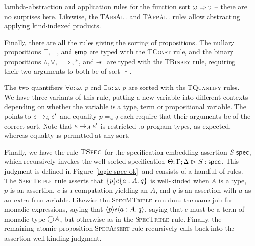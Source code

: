 % 
lambda-abstraction and application rules for the function sort $\omega
\Rightarrow \upsilon$ -- there are no surprises here. Likewise, the
\textsc{TAbsAll} and \textsc{TAppAll} rules allow abstracting
applying kind-indexed products.

Finally, there are all
the rules giving the sorting of propositions. The nullary propositions
$\top, \bot$, and $\mathsf{emp}$ are typed with the \textsc{TConst}
rule, and the binary propositions $\land, \vee, \implies, *$, and
$-\!\!*\,$ are typed with the \textsc{TBinary} rule, requiring
their two arguments to both be of sort $\assert$.


The two quantifiers $\forall u:\omega.\;p$ and $\exists u:\omega.\;p$
are sorted with the \textsc{TQuantify} rules. We have three
variants of this rule, putting a new variable into different contexts
depending on whether the variable is a type, term or propositional
variable.  The points-to $e \mapsto_A e'$ and equality $p =_\omega
q$ each require that their arguments be of the correct sort. Note that
$e \mapsto_A e'$ is restricted to program types, as expected,
whereas equality is permitted at any sort.

Finally, we have the rule $\textsc{TSpec}$ for the
specification-embedding assertion ${S}\;\mathsf{spec}$, which recursively
invokes the well-sorted specification ${\Theta; \Gamma; \Delta} \vartriangleright {S} : \mathsf{spec}$. This judgment is
defined in Figure~\ref{logic-spec-ok}, and consists of a handful of
rules. The \textsc{SpecTriple} rule asserts that $\{{p}\}{c}\{{a:A}.\;{q}\}$
is well-kinded when $A$ is a type, $p$ is an assertion, $c$ is a
computation yielding an $A$, and $q$ is an assertion with $a$ as an
extra free variable.  Likewise the \textsc{SpecMTriple} rule does the
same job for monadic expressions, saying that $\langle{p}\rangle{e}\langle{a:A}.\;{q}\rangle$,
saying that $e$ must be a term of monadic type $\bigcirc{A}$, but
otherwise as in the \textsc{SpecTriple} rule.  Finally, the remaining
atomic proposition \textsc{SpecAssert} rule recursively calls back into the
assertion well-kinding judgment.


